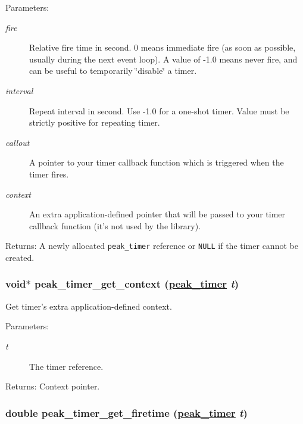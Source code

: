 \begin{Desc}
\item[Parameters:]
\begin{description}
\item[{\em fire}]Relative fire time in second. 0 means immediate fire (as soon as possible, usually during the next event loop). A value of -1.0 means never fire, and can be useful to temporarily \char`\"{}disable\char`\"{} a timer. \item[{\em interval}]Repeat interval in second. Use -1.0 for a one-shot timer. Value must be strictly positive for repeating timer. \item[{\em callout}]A pointer to your timer callback function which is triggered when the timer fires. \item[{\em context}]An extra application-defined pointer that will be passed to your timer callback function (it's not used by the library).\end{description}
\end{Desc}
\begin{Desc}
\item[Returns:]A newly allocated {\tt peak\_\-timer} reference or {\tt NULL} if the timer cannot be created. \end{Desc}
\hypertarget{group__timer_ga6}{
\subsubsection[peak\_\-timer\_\-get\_\-context]{\setlength{\rightskip}{0pt plus 5cm}void$\ast$ peak\_\-timer\_\-get\_\-context (\hyperlink{group__timer_ga0}{peak\_\-timer} {\em t})}}
\label{group__timer_ga6}


Get timer's extra application-defined context. 

\begin{Desc}
\item[Parameters:]
\begin{description}
\item[{\em t}]The timer reference.\end{description}
\end{Desc}
\begin{Desc}
\item[Returns:]Context pointer. \end{Desc}
\hypertarget{group__timer_ga4}{
\subsubsection[peak\_\-timer\_\-get\_\-firetime]{\setlength{\rightskip}{0pt plus 5cm}double peak\_\-timer\_\-get\_\-firetime (\hyperlink{group__timer_ga0}{peak\_\-timer} {\em t})}}
\label{group__timer_ga4}



